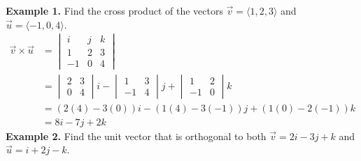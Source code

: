 \newpage
\noindent\textbf{Example 1. } Find the cross product of the vectors $\vec{v} = \langle 1, 2, 3 \rangle$ and $\vec{u} = \langle -1, 0, 4 \rangle$.
\begin{align*}
    \vec{v} \times \vec{u} & = \begin{vmatrix}
                                   i  & j & k \\
                                   1  & 2 & 3 \\
                                   -1 & 0 & 4
                               \end{vmatrix}                     \\
                           & = \begin{vmatrix}
                                   2 & 3 \\
                                   0 & 4
                               \end{vmatrix}i - \begin{vmatrix}
                                                    1  & 3 \\
                                                    -1 & 4
                                                \end{vmatrix}j + \begin{vmatrix}
                                                                     1  & 2 \\
                                                                     -1 & 0
                                                                 \end{vmatrix}k   \\
                           & = (2(4) - 3(0))i - (1(4) - 3(-1))j + (1(0) - 2(-1))k \\
                           & = 8i - 7j + 2k
\end{align*}
\noindent\textbf{Example 2. } Find the unit vector that is orthogonal to both $\vec{v} = 2i - 3j + k$ and $\vec{u} = i + 2j - k$.
